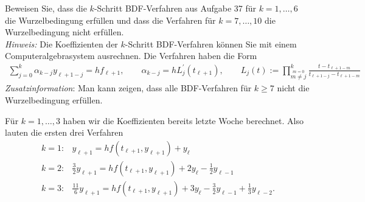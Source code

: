 \begin{exercise}
Beweisen Sie, dass die $k$-Schritt BDF-Verfahren aus Aufgabe 37 für $k = 1,\dots,6$
die Wurzelbedingung erfüllen und dass die Verfahren für $k = 7,\dots,10$
die Wurzelbedingung nicht erfüllen. \\
\textit{Hinweis:} Die Koeffizienten der $k$-Schritt BDF-Verfahren können Sie mit
einem Computeralgebrasystem ausrechnen. Die Verfahren haben die Form
\begin{align}
  \sum_{j= 0}^k \alpha_{k - j}y_{\ell + 1 - j} = hf_{\ell + 1}, \qquad
  \alpha_{k - j} = hL_j^{\prime}(t_{\ell + 1}), \qquad
  L_j(t) := \prod_{\stackrel{m = 0}{m \neq j}}^k \frac{t - t_{\ell + 1 -m}}{t_{\ell + 1 - j} - t_{\ell + 1 - m}}
\end{align}
\textit{Zusatzinformation}: Man kann zeigen, dass alle BDF-Verfahren für $k \geq 7$
nicht die Wurzelbedingung erfüllen.
\end{exercise}
\begin{solution}
Für $k = 1,\dots,3$ haben wir die Koeffizienten bereits letzte Woche berechnet.
Also lauten die ersten drei Verfahren
\begin{align*}
  k = 1:& y_{\ell+1} = hf(t_{\ell + 1},y_{\ell + 1}) + y_{\ell} \\
  k = 2:& \frac{3}{2}y_{\ell+1} = hf(t_{\ell + 1},y_{\ell + 1}) + 2y_{\ell} - \frac{1}{2}y_{\ell - 1} \\
  k = 3:& \frac{11}{6}y_{\ell + 1} = hf(t_{\ell + 1},y_{\ell + 1}) + 3y_{\ell} -
  \frac{3}{2}y_{\ell - 1} + \frac{1}{3}y_{\ell - 2}.
\end{align*}
\end{solution}
